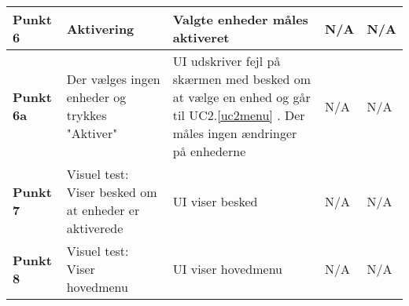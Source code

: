 \begin{center}
\begin{longtable}{|p{}|p{}|p{3cm}|p{3cm}|p{3cm}|}
\textbf{Punkt 6}		&Aktivering			
					&Valgte enheder måles aktiveret
					&N/A 
					&N/A \\\hline
															
\textbf{Punkt 6a}	&Der vælges ingen enheder og trykkes "Aktiver"				
					&UI udskriver fejl på skærmen med besked om at vælge en enhed og går til UC2.\ref{uc2menu}	. 
					 Der måles ingen ændringer på enhederne
					&N/A 
					&N/A \\\hline
		
\textbf{Punkt 7}		&Visuel test: Viser besked om at enheder er aktiverede
					&UI viser besked
					&N/A
					&N/A \\\hline
					
\textbf{Punkt 8}		&Visuel test: Viser hovedmenu
					&UI viser hovedmenu
					&N/A
					&N/A \\\hline

															
	\end{longtable}
	\label{ATUC2} 
\end{center}